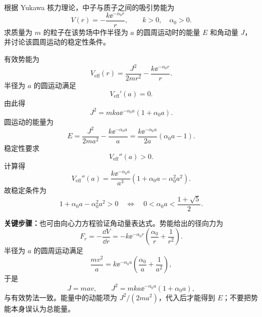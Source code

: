 \begin{question}
根据 Yukawa 核力理论，中子与质子之间的吸引势能为
\[
  V(r)=-\frac{k\ee^{-\alpha_0 r}}{r},
  \qquad k>0,\quad \alpha_0>0.
\]
求质量为 $m$ 的粒子在该势场中作半径为 $a$ 的圆周运动时的能量 $E$ 和角动量 $J$，并讨论该圆周运动的稳定性条件。

\begin{solution}
有效势能为
\[
  V_{\mathrm{eff}}(r)=\frac{J^2}{2mr^2}-\frac{k\ee^{-\alpha_0r}}{r}.
\]
半径为 $a$ 的圆运动满足
\[
  V_{\mathrm{eff}}'(a)=0.
\]
由此得
\[
  \boxed{J^2=mka\ee^{-\alpha_0a}(1+\alpha_0a)}.
\]
圆运动的能量为
\[
  E=\frac{J^2}{2ma^2}-\frac{k\ee^{-\alpha_0a}}{a}
  =\boxed{\frac{k\ee^{-\alpha_0a}}{2a}(\alpha_0a-1)}.
\]
稳定性要求
\[
  V_{\mathrm{eff}}''(a)>0.
\]
计算得
\[
  V_{\mathrm{eff}}''(a)=\frac{k\ee^{-\alpha_0a}}{a^3}
  \left(1+\alpha_0a-\alpha_0^2a^2\right).
\]
故稳定条件为
\[
  \boxed{1+\alpha_0a-\alpha_0^2a^2>0}
  \quad\Longleftrightarrow\quad
  \boxed{0<\alpha_0a<\frac{1+\sqrt5}{2}}.
\]


\medskip
\textbf{关键步骤：}也可由向心力方程验证角动量表达式。势能给出的径向力为
\[
  F_r=-\frac{\dd V}{\dd r}
  =-k\ee^{-\alpha_0r}\left(\frac{\alpha_0}{r}+\frac{1}{r^2}\right).
\]
半径为 $a$ 的圆周运动满足
\[
  \frac{mv^2}{a}=k\ee^{-\alpha_0a}\left(\frac{\alpha_0}{a}+\frac{1}{a^2}\right),
\]
于是
\[
  J=mav,
  \qquad
  J^2=mka\ee^{-\alpha_0a}(1+\alpha_0a),
\]
与有效势法一致。能量中的动能项为 $J^2/(2ma^2)$，代入后才能得到 $E$；不要把势能本身误认为总能量。
\end{solution}
\end{question}

